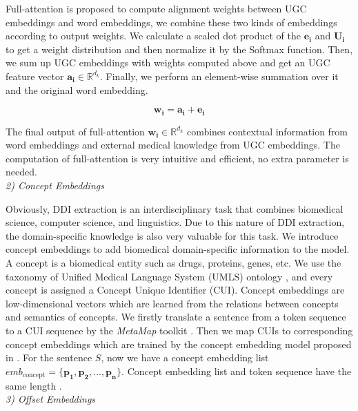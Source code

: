 \documentclass[conference]{IEEEtran}
\begin{document}
Full-attention is proposed to compute alignment weights between UGC embeddings and word embeddings,
we combine these two kinds of embeddings according to output weights.
We calculate a scaled dot product of the $\bm{e_i}$ and $\bm{U_i}$ to get a weight distribution
and then normalize it by the Softmax function.
Then, we sum up UGC embeddings with weights computed above
and get an UGC feature vector $\bm{a_i} \in \mathbb{R}^{d_k}$.
Finally, we perform an element-wise summation over it and the original word embedding.

\begin{equation}
\bm{w_i} = \bm{a_i} + \bm{e_i}
\end{equation}

The final output of full-attention $\bm{w_i} \in \mathbb{R}^{d_k}$ combines contextual information from word 
embeddings and external medical knowledge from UGC embeddings.
The computation of full-attention is very intuitive and efficient, no extra parameter is needed.\\

\emph{2) Concept Embeddings}

\bigbreak

Obviously, DDI extraction is an interdisciplinary task that combines biomedical science, computer science, and linguistics.
Due to this nature of DDI extraction, the domain-specific knowledge is also very valuable for this task.
We introduce concept embeddings to add biomedical domain-specific information to the model.
A concept is a biomedical entity such as drugs, proteins, genes, etc.
We use the taxonomy of Unified Medical Language System (UMLS) ontology \cite{bodenreider_unified_2004},
and every concept is assigned a Concept Unique Identifier (CUI).
Concept embeddings are low-dimensional vectors which are learned from the relations between 
concepts and semantics of concepts.
We firstly translate a sentence from a token sequence to a CUI sequence by the \emph{MetaMap} toolkit \cite{aronson_overview_2010}.
Then we map CUIs to corresponding concept embeddings which are trained by the concept embedding model proposed in \cite{de_vine_medical_2014}.
For the sentence $S$, now we have a concept embedding list
$emb_{\text{concept}} = \{ \bm{p_1}, \bm{p_2}, \dots, \bm{p_n}\}$.
Concept embedding list and token sequence have the same length \cite{wang_ontology-based_2017}.\\

\emph{3) Offset Embeddings}

\bigbreak
\end{document}

